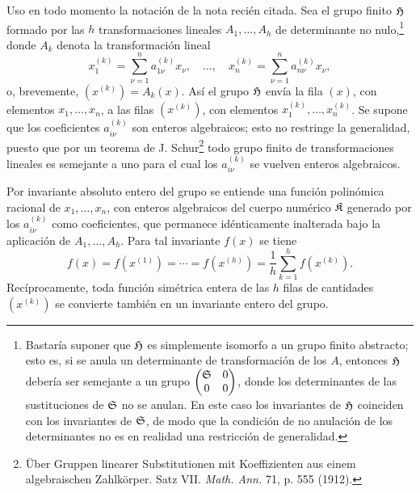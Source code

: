 Uso en todo momento la notación de la nota recién citada. Sea el grupo finito \(\mathfrak H\) formado por las \(h\) transformaciones lineales \(A_1,\ldots,A_h\) de determinante no nulo,\footnote{Bastaría suponer que \(\mathfrak H\) es simplemente isomorfo a un grupo finito abstracto; esto es, si se anula un determinante de transformación de los \(A\), entonces \(\mathfrak H\) debería ser semejante a un grupo \(\begin{pmatrix}\mathfrak S&0\\0&0\end{pmatrix}\), donde los determinantes de las sustituciones de \(\mathfrak S\) no se anulan. En este caso los invariantes de \(\mathfrak H\) coinciden con los invariantes de \(\mathfrak S\), de modo que la condición de no anulación de los determinantes no es en realidad una restricción de generalidad.} donde \(A_k\) denota la transformación lineal
\[
        x_1^{(k)}=\sum_{\nu=1}^{n}a_{1\nu}^{(k)}x_\nu,
        \quad\ldots,\quad
        x_n^{(k)}=\sum_{\nu=1}^{n}a_{n\nu}^{(k)}x_\nu,
\]
o, brevemente, \((x^{(k)})=A_k(x)\). Así el grupo \(\mathfrak H\) envía la fila \((x)\), con elementos \(x_1,\ldots,x_n\), a las filas \((x^{(k)})\), con elementos \(x_1^{(k)},\ldots,x_n^{(k)}\). Se supone que los coeficientes \(a_{i\nu}^{(k)}\) son enteros algebraicos; esto no restringe la generalidad, puesto que por un teorema de J. Schur\footnote{Über Gruppen linearer Substitutionen mit Koeffizienten aus einem algebraischen Zahlkörper. Satz VII. \emph{Math. Ann.} 71, p. 555 (1912).} todo grupo finito de transformaciones lineales es semejante a uno para el cual los \(a_{i\nu}^{(k)}\) se vuelven enteros algebraicos.

Por invariante absoluto entero del grupo se entiende una función polinómica racional de \(x_1,\ldots,x_n\), con enteros algebraicos del cuerpo numérico \(\mathfrak K\) generado por los \(a_{i\nu}^{(k)}\) como coeficientes, que permanece idénticamente inalterada bajo la aplicación de \(A_1,\ldots,A_h\). Para tal invariante \(f(x)\) se tiene
\begin{equation}
        f(x)=f(x^{(1)})=\cdots=f(x^{(h)})
        =\frac1h\sum_{k=1}^{h}f(x^{(k)}).
\end{equation}
Recíprocamente, toda función simétrica entera de las \(h\) filas de cantidades \((x^{(k)})\) se convierte también en un invariante entero del grupo.

